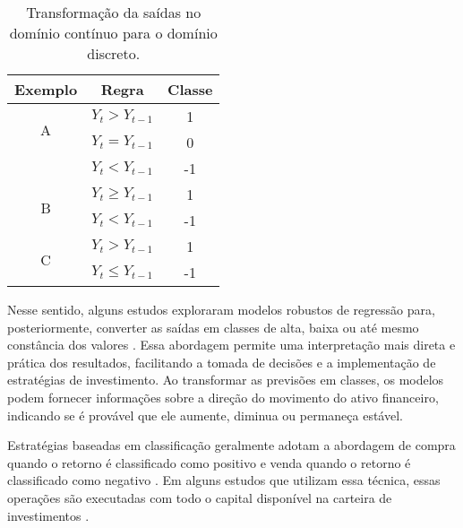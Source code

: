 \begin{table}[h]
\begin{center}
\begin{tabular}{ccc}
\hline
Exemplo            & Regra                   & Classe \\ \hline
\multirow{2}{*}{A} & $Y_{t} > Y_{t-1}$    & 1      \\
             & $Y_{t} =Y_{t-1}$              & 0      \\
             & $Y_{t} < Y_{t-1}$       & -1     \\ \hline
\multirow{2}{*}{B} & $Y_t \geq Y_{t-1}$ & 1      \\
             & $Y_t < Y_{t-1}$       & -1     \\ \hline
\multirow{2}{*}{C} & $Y_t > Y_{t-1}$    & 1      \\
             & $Y_t \leq Y_{t-1}$    & -1     \\ \hline
\end{tabular}
\end{center}
\caption{Transformação da saídas no domínio contínuo para o domínio discreto.}
\label{tab:RegraTransf}
\end{table}

Nesse sentido, alguns estudos exploraram modelos robustos de regressão para, posteriormente, converter as saídas em classes de alta, baixa ou até mesmo constância dos valores \cite{ampomah2020evaluation, jiang2020improved, Xiaoci_Predicting}. Essa abordagem permite uma interpretação mais direta e prática dos resultados, facilitando a tomada de decisões e a implementação de estratégias de investimento. Ao transformar as previsões em classes, os modelos podem fornecer informações sobre a direção do movimento do ativo financeiro, indicando se é provável que ele aumente, diminua ou permaneça estável. 

Estratégias baseadas em classificação geralmente adotam a abordagem de compra quando o retorno é classificado como positivo e venda quando o retorno é classificado como negativo \cite{Chaojie_Stock}. Em alguns estudos que utilizam essa técnica, essas operações são executadas com todo o capital disponível na carteira de investimentos \cite{Jerzy_Deep, Charlene, C_Veeramani_Exploration}.

